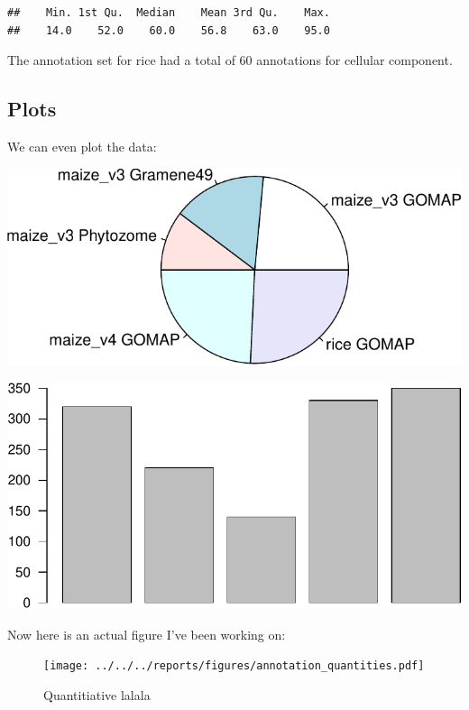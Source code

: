 \documentclass[utf8]{frontiersSCNS} %
\newenvironment{Shaded}{\begin{snugshade}}{\end{snugshade}}
\newcommand{\KeywordTok}[1]{\textcolor[rgb]{0.13,0.29,0.53}{\textbf{{#1}}}}
\newcommand{\DataTypeTok}[1]{\textcolor[rgb]{0.13,0.29,0.53}{{#1}}}
\newcommand{\DecValTok}[1]{\textcolor[rgb]{0.00,0.00,0.81}{{#1}}}
\newcommand{\StringTok}[1]{\textcolor[rgb]{0.31,0.60,0.02}{{#1}}}
\newcommand{\NormalTok}[1]{{#1}}
\begin{document}
\begin{Shaded}
\end{Shaded}

\begin{verbatim}
##    Min. 1st Qu.  Median    Mean 3rd Qu.    Max. 
##    14.0    52.0    60.0    56.8    63.0    95.0
\end{verbatim}

The annotation set for rice had a total of 60 annotations for cellular
component.

\subsection{Plots}\label{plots}

We can even plot the data:

\begin{Shaded}
\end{Shaded}

\includegraphics{demo-manuscript_files/figure-latex/plot-1.pdf}

\begin{Shaded}
\end{Shaded}

\includegraphics{demo-manuscript_files/figure-latex/plot2-1.pdf}

Now here is an actual figure I've been working on:

\begin{figure}[htbp]
\centering
\texttt{[image: ../../../reports/figures/annotation\_quantities.pdf]}
\caption{Quantitiative lalala}
\end{figure}
\end{document}
